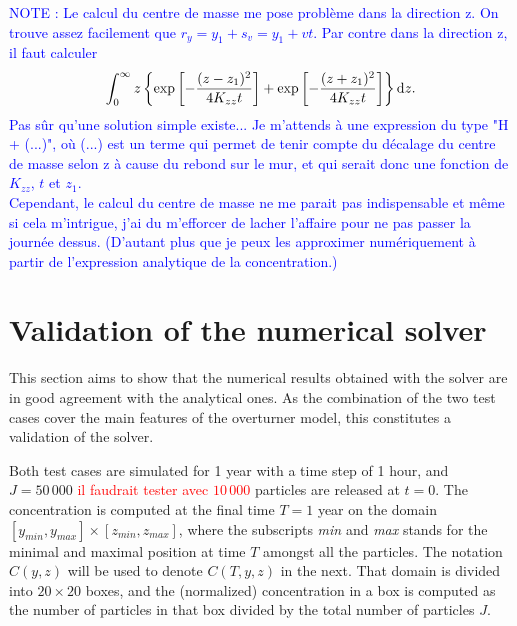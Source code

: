 \textcolor{blue}{NOTE : Le calcul du centre de masse me pose problème dans la direction z. On trouve assez facilement que $r_y = y_1 + s_v = y_1 + vt$. Par contre dans la direction z, il faut calculer $$\int_{0}^{\infty} z \left\{\exp\left[-\frac{(z-z_1)^2}{4K_{zz}t} \right] + \exp\left[-\frac{(z+z_1)^2}{4K_{zz}t} \right] \right\}\rm dz.$$ Pas sûr qu'une solution simple existe... Je m'attends à une expression du type "H + (...)", où (...) est un terme qui permet de tenir compte du décalage du centre de masse selon z à cause du rebond sur le mur, et qui serait donc une fonction de $K_{zz}$, $t$ et $z_1$.\\
Cependant, le calcul du centre de masse ne me parait pas indispensable et même si cela m'intrigue, j'ai du m'efforcer de lacher l'affaire pour ne pas passer la journée dessus. (D'autant plus que je peux les approximer numériquement à partir de l'expression analytique de la concentration.)}

\section{Validation of the numerical solver}
This section aims to show that the numerical results obtained with the solver are in good agreement with the analytical ones. As the combination of the two test cases cover the main features of the overturner model, this constitutes a validation of the solver. 

Both test cases are simulated for 1 year with a time step of 1 hour, and $J = 50\,000$ \textcolor{red}{il faudrait tester avec $10\,000$} particles are released at $t=0$.
The concentration is computed at the final time $T = 1$ year on the domain $[y_{min},y_{max}] \times [z_{min},z_{max}]$, where the subscripts \textit{min} and \textit{max} stands for the minimal and maximal position at time $T$ amongst all the particles. The notation $C(y,z)$ will be used to denote $C(T,y,z)$ in the next. That domain is divided into $20 \times 20$ boxes, and the (normalized) concentration in a box is computed as the number of particles in that box divided by the total number of particles $J$.

